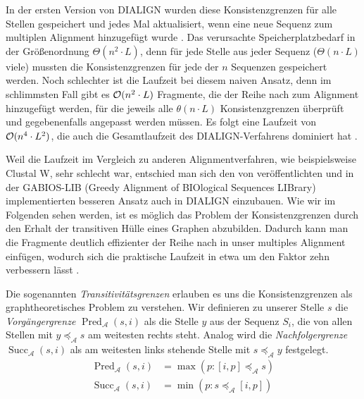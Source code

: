 In der ersten Version von DIALIGN wurden diese Konsistenzgrenzen für alle Stellen gespeichert und jedes Mal aktualisiert, wenn eine neue Sequenz zum multiplen Alignment hinzugefügt wurde \cite{mdw96}. Das verursachte Speicherplatzbedarf in der Größenordnung $\Theta(n^2\cdot L)$, denn für jede Stelle aus jeder Sequenz ($\Theta(n\cdot L)$ viele) mussten die Konsistenzgrenzen für jede der $n$ Sequenzen gespeichert werden. Noch schlechter ist die Laufzeit bei diesem naiven Ansatz, denn im schlimmsten Fall gibt es $\mathcal{O}(n^2\cdot L)$ Fragmente, die der Reihe nach zum Alignment hinzugefügt werden, für die jeweils alle $\theta(n\cdot L)$ Konsistenzgrenzen überprüft und gegebenenfalls angepasst werden müssen. Es folgt eine Laufzeit von $\mathcal{O}(n^4\cdot L^2)$, die auch die Gesamtlaufzeit des DIALIGN-Verfahrens dominiert hat \cite{m99}. 

Weil die Laufzeit im Vergleich zu anderen Alignmentverfahren, wie beispielsweise Clustal W, sehr schlecht war, entschied man sich den von \cite{a97} veröffentlichten und in der GABIOS-LIB (Greedy Alignment of BIOlogical Sequences LIBrary) implementierten besseren Ansatz auch in DIALIGN	einzubauen. Wie wir im Folgenden sehen werden, ist es möglich das Problem der Konsistenzgrenzen durch den Erhalt der transitiven Hülle eines Graphen abzubilden. Dadurch kann man die Fragmente deutlich effizienter der Reihe nach in unser multiples Alignment einfügen, wodurch sich die praktische Laufzeit in etwa um den Faktor zehn verbessern lässt \cite{am00}. 

\begin{definition}
	Die sogenannten \emph{Transitivitätsgrenzen} erlauben es uns die Konsistenzgrenzen als graphtheoretisches Problem zu verstehen. Wir definieren zu unserer Stelle $s$ die \emph{Vorgängergrenze} $\operatorname{Pred}_{\mathcal{A}}(s,i)$ als die Stelle $y$ aus der Sequenz $S_i$, die von allen Stellen mit $y \preceq_{\mathcal{A}} s$ am weitesten rechts steht. Analog wird die \emph{Nachfolgergrenze} $\operatorname{Succ}_{\mathcal{A}}(s,i)$ als am weitesten links stehende Stelle mit $s \preceq_{\mathcal{A}} y$ festgelegt.
	\begin{equation}
	\begin{split}
		\operatorname{\operatorname{Pred}}_{\mathcal{A}}(s,i) &= \max(p: [i,p] \preceq_{\mathcal{A}} s) \\
		\operatorname{\operatorname{Succ}}_{\mathcal{A}}(s,i) &= \min(p: s \preceq_{\mathcal{A}} [i,p])
	\end{split}
	\end{equation}
\end{definition}

